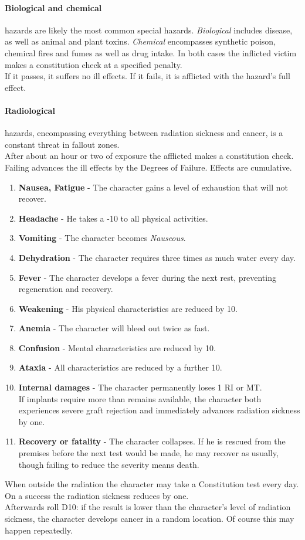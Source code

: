 \documentclass[12pt,a4paper,openany,dvipsnames]{book}
\begin{document}
	\paragraph{Biological and chemical} hazards are likely the most common special hazards. \emph{Biological} includes disease, as well as animal and plant toxins. \emph{Chemical} encompasses synthetic poison, chemical fires and fumes as well as drug intake. In both cases the inflicted victim makes a constitution check at a specified penalty.\\
	If it passes, it suffers no ill effects. If it fails, it is afflicted with the hazard’s full effect.
	\paragraph{Radiological} hazards, encompassing everything between radiation sickness and cancer, is a constant threat in fallout zones.\\
	After about an hour or two of exposure the afflicted makes a constitution check. Failing advances the ill effects by the Degrees of Failure.
	Effects are cumulative.
	\begin{enumerate}
		\setlength\itemsep{-10mm}
		\item \textbf{Nausea, Fatigue} - The character gains a level of exhaustion that will not recover.
		\item \textbf{Headache} - He takes a -10 to all physical activities.
		\item \textbf{Vomiting} - The character becomes \emph{Nauseous}.
		\item \textbf{Dehydration} - The character requires three times as much water every day.
		\item \textbf{Fever} - The character develops a fever during the next rest, preventing regeneration and recovery.
		\item \textbf{Weakening} - His physical characteristics are reduced by 10.
		\item \textbf{Anemia} - The character will bleed out twice as fast.
		\item \textbf{Confusion} - Mental characteristics are reduced by 10.
		\item \textbf{Ataxia} - All characteristics are reduced by a further 10.
		\item \textbf{Internal damages} - The character permanently loses 1 RI or MT.
			\\%
			If implants require more than remains available,
			the character both experiences severe graft rejection and immediately advances radiation sickness by one.
		\item \textbf{Recovery or fatality} - The character collapses. If he is rescued from the premises before the next test would be made, he may recover as usually, though failing to reduce the severity means death.
	\end{enumerate}
	\par
	When outside the radiation the character may take a Constitution test every day. On a success the radiation sickness reduces by one.\\
	Afterwards roll D10: if the result is lower than the character's level of radiation sickness, the character develops cancer in a random location.
	Of course this may happen repeatedly.
\end{document}
